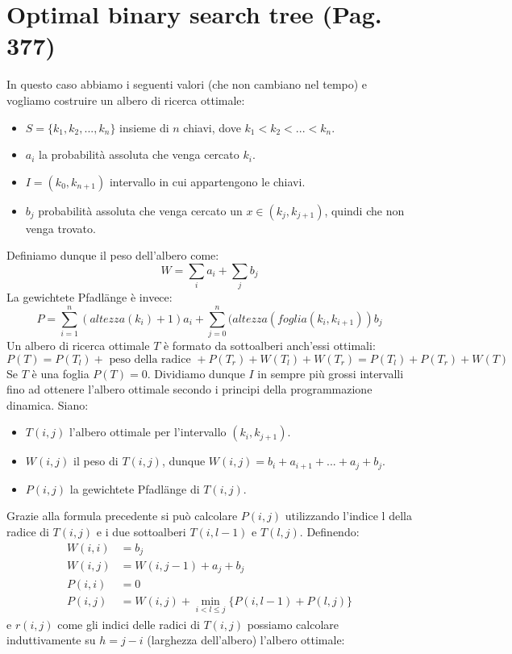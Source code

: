 \documentclass[a4paper]{book}
\begin{document}
\section{Optimal binary search tree (Pag. 377)}
In questo caso abbiamo i seguenti valori (che non cambiano nel tempo) e vogliamo costruire un albero di ricerca ottimale:
\begin{itemize}
\item $S=\{k_1,k_2, ..., k_n \}$ insieme di $n$ chiavi, dove $k_1<k_2<...<k_n$.
\item $a_i$ la probabilità assoluta che venga cercato $k_i$.
\item $I=(k_0,k_{n+1})$ intervallo in cui appartengono le chiavi.
\item $b_j$ probabilità assoluta che venga cercato un $x \in (k_j, k_{j+1})$, quindi che non venga trovato.
\end{itemize}
Definiamo dunque il peso dell'albero come:
$$W=\sum_i a_i + \sum_j b_j$$
La gewichtete Pfadlänge  è invece:
$$ P= \sum_{i=1}^n (altezza(k_i)+1)a_i+\sum_{j=0}^n (altezza(foglia(k_i,k_{i+1}))b_j$$
Un albero di ricerca ottimale $T$ è formato da sottoalberi anch'essi ottimali: 
$$ P(T)= P(T_l)+\mbox{ peso della radice }+P(T_r)+W(T_l)+W(T_r)=P(T_l)+P(T_r)+W(T)$$
Se $T$ è una foglia $P(T)=0$. Dividiamo dunque $I$ in sempre più grossi intervalli fino ad ottenere l'albero ottimale secondo i principi della programmazione dinamica. Siano:
\begin{itemize}
\item $T(i,j)$ l'albero ottimale per l'intervallo $(k_i,k_{j+1})$.
\item $W(i,j)$ il peso di $T(i,j)$, dunque $W(i,j)=b_i+a_{i+1}+...+a_j+b_j$.
\item $P(i,j)$ la gewichtete Pfadlänge di $T(i,j)$.
\end{itemize}
Grazie alla formula precedente si può calcolare $P(i,j)$ utilizzando l'indice l della radice di $T(i,j)$ e i due sottoalberi $T(i,l-1)$ e $T(l,j)$. Definendo:
\begin{align*}
W(i,i)&=b_j\\
W(i,j)&=W(i,j-1)+a_j+b_j\\
P(i,i)&=0\\
P(i,j)&=W(i,j)+\min_{i<l\leq j} \{P(i,l-1)+P(l,j)\}
\end{align*}
e $r(i,j)$ come gli indici delle radici di $T(i,j)$ possiamo calcolare induttivamente su $h=j-i$ (larghezza dell'albero) l'albero ottimale:
\end{document}
